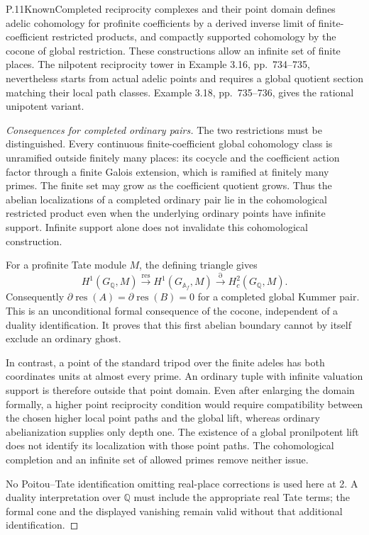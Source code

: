 \begin{result}{P.11}{Known}{Completed reciprocity complexes and their point domain}
\citet[Definitions 3.1--3.3, p.~728; Definition 3.10, p.~733]{LitPridham2020}
defines adelic cohomology for profinite coefficients by a derived inverse
limit of finite-coefficient restricted products, and compactly supported
cohomology by the cocone of global restriction. These constructions allow
an infinite set of finite places. The nilpotent reciprocity tower in
Example 3.16, pp.~734--735, nevertheless starts from actual adelic points
and requires a global quotient section matching their local path classes.
Example 3.18, pp.~735--736, gives the rational unipotent variant.
\end{result}
\begin{proof}[Consequences for completed ordinary pairs]
The two restrictions must be distinguished. Every continuous
finite-coefficient global cohomology class is unramified outside finitely
many places: its cocycle and the coefficient action factor through a
finite Galois extension, which is ramified at finitely many primes.
The finite set may grow as the coefficient quotient grows. Thus the
abelian localizations of a completed ordinary pair lie in the
cohomological restricted product even when the underlying ordinary
points have infinite support. Infinite support alone does not invalidate
this cohomological construction.

For a profinite Tate module \(M\), the defining triangle gives
\[
 H^1(G_{\mathbb Q},M)\xrightarrow{\operatorname{res}}
 H^1(G_{\mathbb A_f},M)\xrightarrow{\partial}
 H_c^2(G_{\mathbb Q},M).
\]
Consequently \(\partial\operatorname{res}(A)=
\partial\operatorname{res}(B)=0\) for a completed global Kummer pair.
This is an unconditional formal consequence of the cocone, independent
of a duality identification. It proves that this first abelian boundary
cannot by itself exclude an ordinary ghost.

In contrast, a point of the standard tripod over the finite adeles has
both coordinates units at almost every prime. An ordinary tuple with
infinite valuation support is therefore outside that point domain.
Even after enlarging the domain formally, a higher point reciprocity
condition would require compatibility between the chosen higher local
point paths and the global lift, whereas ordinary abelianization supplies
only depth one. The existence of a global pronilpotent lift does not
identify its localization with those point paths. The cohomological
completion and an infinite set of allowed primes remove neither issue.

No Poitou--Tate identification omitting real-place corrections is used
here at 2. A duality interpretation over \(\mathbb Q\) must include the
appropriate real Tate terms; the formal cone and the displayed vanishing
remain valid without that additional identification.
\end{proof}

